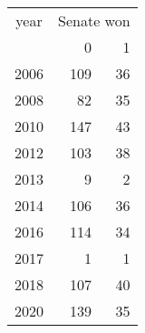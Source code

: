 \footnotesize\begin{tabular}[t]{lrr}
\toprule
\multicolumn{1}{c}{year} & \multicolumn{2}{c}{Senate won} \\
\cmidrule(l{3pt}r{3pt}){1-1} \cmidrule(l{3pt}r{3pt}){2-3}
  & 0 & 1\\
\midrule
2006 & 109 & 36\\
2008 & 82 & 35\\
2010 & 147 & 43\\
2012 & 103 & 38\\
2013 & 9 & 2\\
2014 & 106 & 36\\
2016 & 114 & 34\\
2017 & 1 & 1\\
2018 & 107 & 40\\
2020 & 139 & 35\\
\bottomrule
\end{tabular}
